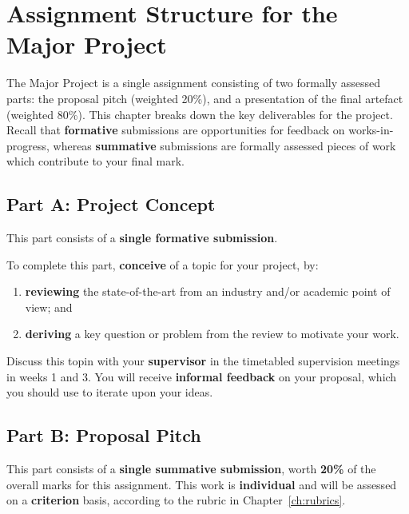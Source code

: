 \chapter{Assignment Structure for the Major Project} \label{ch:assignment}

The Major Project is a single assignment consisting of two formally assessed parts: the proposal pitch (weighted 20\%), and a presentation of the final artefact (weighted 80\%).
This chapter breaks down the key deliverables for the project.
Recall that \textbf{formative} submissions are opportunities for feedback on works-in-progress, whereas \textbf{summative} submissions are formally assessed pieces of work which contribute to your final mark.

\section*{Part A: Project Concept}

This part consists of a \textbf{single formative submission}.

To complete this part, \textbf{conceive} of a topic for your project, by:
\begin{enumerate}[label=(\roman*)]
	\item \textbf{reviewing} the state-of-the-art from an industry and/or academic point of view; and
	\item \textbf{deriving} a key question or problem from the review to motivate your work.
\end{enumerate}

Discuss this topin with your \textbf{supervisor} in the timetabled supervision meetings in weeks 1 and 3. You will receive \textbf{informal feedback} on your proposal,
which you should use to iterate upon your ideas.

\section*{Part B: Proposal Pitch}

This part consists of a \textbf{single summative submission}, worth \textbf{20\%} of the overall marks for this assignment.
This work is \textbf{individual} and will be assessed on a \textbf{criterion} basis, according to the rubric in Chapter~\ref{ch:rubrics}.

